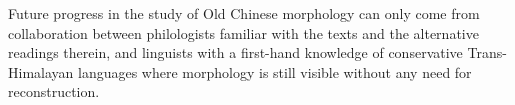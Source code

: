 \documentclass[oldfontcommands,oneside,a4paper,11pt]{article}
\begin{document}
Future progress in the study of Old Chinese morphology can only come from collaboration between philologists familiar with the texts and the alternative readings therein, and linguists with a first-hand knowledge of conservative Trans-Himalayan languages where morphology is still visible without any need for reconstruction.



\end{document}
